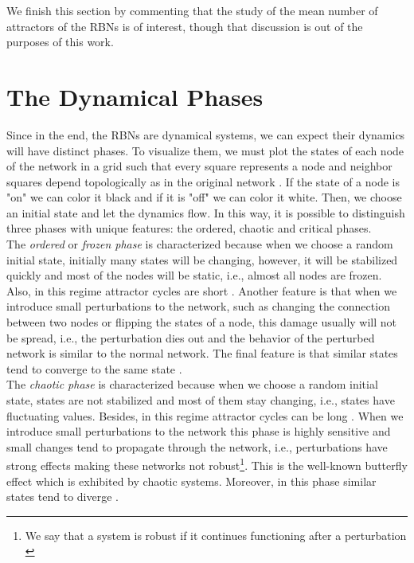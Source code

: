 We finish this section by commenting that the study of the mean number of attractors of the RBNs is of interest, though that discussion is out of the purposes of this work.

\section{The Dynamical Phases}
Since in the end, the RBNs are dynamical systems, we can expect their dynamics will have distinct phases. To visualize them, we must plot the states of each node of the network in a grid such that every square represents a node and neighbor squares depend topologically as in the original network \cite{rbn_carlos}. If the state of a node is "on" we can color it black and if it is "off" we can color it white. Then, we choose an initial state and let the dynamics flow. In this way, it is possible to distinguish three phases with unique features: the ordered, chaotic and critical phases.\\

The \textit{ordered} or \textit{frozen phase} is characterized because when we choose a random initial state, initially many states will be changing, however, it will be stabilized quickly and most of the nodes will be static, i.e., almost all nodes are frozen. Also, in this regime attractor cycles are short \cite{attractors}. Another feature is that when we introduce small perturbations to the network, such as changing the connection between two nodes or flipping the states of a node, this damage usually will not be spread, i.e., the perturbation dies out and the behavior of the perturbed network is similar to the normal network. The final feature is that similar states tend to converge to the same state \cite{rbn_carlos}.\\

The \textit{chaotic phase} is characterized because when we choose a random initial state, states are not stabilized and most of them stay changing, i.e., states have fluctuating values. Besides, in this regime attractor cycles can be long \cite{attractors}. When we introduce small perturbations to the network this phase is highly sensitive and small changes tend to propagate through the network, i.e., perturbations have strong effects making these networks not robust\footnote{We say that a system is robust if it continues functioning after a perturbation \cite{guiding_rbn}}. This is the well-known butterfly effect which is exhibited by chaotic systems. Moreover, in this phase similar states tend to diverge \cite{rbn_carlos}.\\

